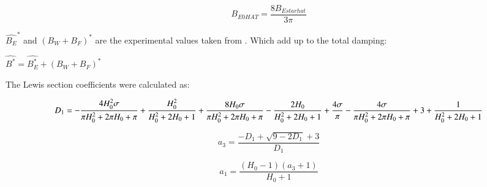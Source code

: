             
    
    \begin{equation}
B_{E0 HAT} = \frac{8 B_{E star hat}}{3 \pi}
\label{eq:equation}
\end{equation}

    

    \(\hat{B_E}^*\) and \((B_W+B_F)^*\) are the experimental values taken
from \cite{7505983/4AFVVGNT}. Which add up to the total damping:

    \(\hat{B^*} = \hat{B^*_E} + (B_W+B_F)^*\)

    The Lewis section coefficients were calculated as:
 
            
    
    \begin{equation}
D_{1} = - \frac{4 H_{0}^{2} \sigma}{\pi H_{0}^{2} \\ + 2 \pi H_{0} \\ + \pi} \\ + \frac{H_{0}^{2}}{H_{0}^{2} \\ + 2 H_{0} \\ + 1} \\ + \frac{8 H_{0} \sigma}{\pi H_{0}^{2} \\ + 2 \pi H_{0} \\ + \pi} - \frac{2 H_{0}}{H_{0}^{2} \\ + 2 H_{0} \\ + 1} \\ + \frac{4 \sigma}{\pi} - \frac{4 \sigma}{\pi H_{0}^{2} \\ + 2 \pi H_{0} \\ + \pi} \\ + 3 \\ + \frac{1}{H_{0}^{2} \\ + 2 H_{0} \\ + 1}
\label{eq:equation}
\end{equation}

    
 
            
    
    \begin{equation}
a_{3} = \frac{- D_{1} + \sqrt{9 - 2 D_{1}} + 3}{D_{1}}
\label{eq:equation}
\end{equation}

    
 
            
    
    \begin{equation}
a_{1} = \frac{\left(H_{0} - 1\right) \left(a_{3} + 1\right)}{H_{0} + 1}
\label{eq:equation}
\end{equation}

